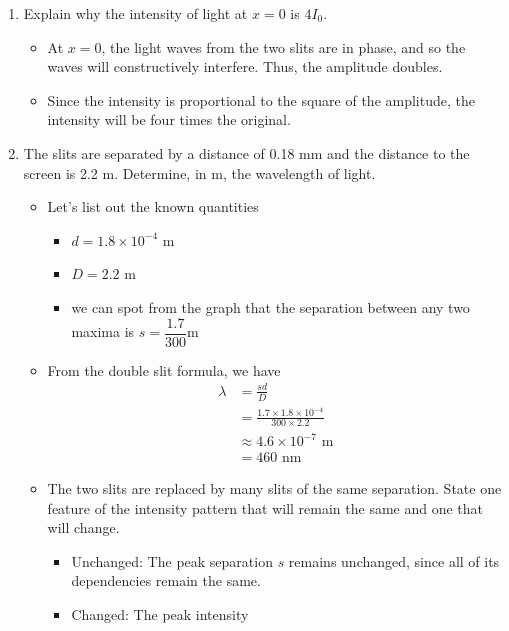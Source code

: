 \documentclass[a4paper,12pt]{article}
\begin{document}
\begin{enumerate}[label=(\alph*)]
        \begin{enumerate}[label=(\roman*)]
          \item Explain why the intensity of light at $x=0$ is $4I_0$.
                \begin{itemize}
                  \item At $x = 0$, the light waves from the two slits are in phase, and so the waves will constructively interfere. Thus, the amplitude doubles.
                  \item Since the intensity is proportional to the square of the amplitude, the intensity will be four times the original.
                \end{itemize}
          \item The slits are separated by a distance of 0.18 mm and the distance to the screen is 2.2 m. Determine, in m, the wavelength of light.
                \begin{itemize}
                  \item Let's list out the known quantities
                        \begin{itemize}
                          \item $d = 1.8 \times 10^{-4}$ m
                          \item $D = 2.2$ m
                          \item we can spot from the graph that the separation between any two maxima is $s = \dfrac{1.7}{300}$m
                        \end{itemize}
                  \item From the double slit formula, we have
                        \begin{align*}
                          \lambda & = \frac{sd}{D}                                     \\
                                  & = \frac{1.7\times1.8 \times 10^{-4}}{300\times2.2} \\
                                  & \approx4.6 \times 10^{-7} \text{ m}                \\
                                  & = 460 \text{ nm}
                        \end{align*}
                  \item The two slits are replaced by many slits of the same separation. State one feature of the intensity pattern that will remain the same and one that will change.
                        \begin{itemize}
                          \item Unchanged: The peak separation $s$ remains unchanged, since all of its dependencies remain the same.
                          \item Changed: The peak intensity
                        \end{itemize}
                \end{itemize}
        \end{enumerate}
\end{enumerate}
\end{document}
